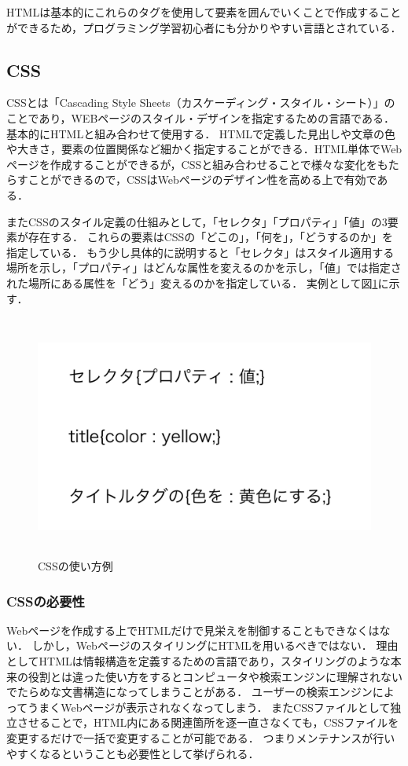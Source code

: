 \documentclass[12pt,a4j]{ltjsarticle}
\begin{document}
HTMLは基本的にこれらのタグを使用して要素を囲んでいくことで作成することができるため，プログラミング学習初心者にも分かりやすい言語とされている．
\clearpage

\subsection{CSS}
CSSとは「Cascading Style Sheets（カスケーディング・スタイル・シート）」のことであり，WEBページのスタイル・デザインを指定するための言語である\cite{css}．
基本的にHTMLと組み合わせて使用する．
HTMLで定義した見出しや文章の色や大きさ，要素の位置関係など細かく指定することができる．HTML単体でWebページを作成することができるが，CSSと組み合わせることで様々な変化をもたらすことができるので，CSSはWebページのデザイン性を高める上で有効である．

またCSSのスタイル定義の仕組みとして，「セレクタ」「プロパティ」「値」の3要素が存在する．
これらの要素はCSSの「どこの」，「何を」，「どうするのか」を指定している．
もう少し具体的に説明すると「セレクタ」はスタイル適用する場所を示し，「プロパティ」はどんな属性を変えるのかを示し，「値」では指定された場所にある属性を「どう」変えるのかを指定している．
実例として図\ref{fig:CSS_ex}に示す．

\begin{figure}[h]
\begin{center}
\includegraphics[height = 80mm ] {figures/css_ele.pdf}
\caption{CSSの使い方例}
\label{fig:CSS_ex}
\end{center}
\end{figure}

\clearpage

\subsubsection{CSSの必要性}
Webページを作成する上でHTMLだけで見栄えを制御することもできなくはない．
しかし，WebページのスタイリングにHTMLを用いるべきではない．
理由としてHTMLは情報構造を定義するための言語であり，スタイリングのような本来の役割とは違った使い方をするとコンピュータや検索エンジンに理解されないでたらめな文書構造になってしまうことがある．
ユーザーの検索エンジンによってうまくWebページが表示されなくなってしまう．
またCSSファイルとして独立させることで，HTML内にある関連箇所を逐一直さなくても，CSSファイルを変更するだけで一括で変更することが可能である．
つまりメンテナンスが行いやすくなるということも必要性として挙げられる\cite{css2}．
\end{document}
